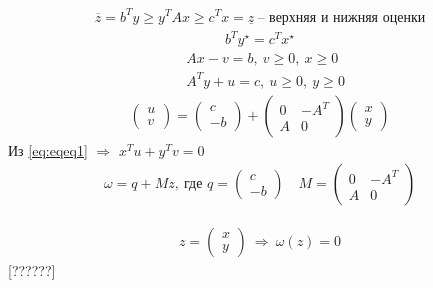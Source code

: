 \documentclass[12pt,a4paper,titlepage,oneside]{book}
\theoremstyle{definition}
\theoremstyle{plain}
\theoremstyle{remark}
\theoremstyle{remark}
\theoremstyle{plain}
\theoremstyle{plain}
\begin{document}
\begin{align*}
\overline{z} = b^T y \geq y^TAx\geq c^Tx = \underline{z} \: \text{-- верхняя и нижняя оценки}
\end{align*}
\begin{align}\label{eq:eqeq1}
b^Ty^\star = c^Tx^\star
\end{align}
\begin{align*}
&Ax - v = b, \: v \geq 0, \: x\geq 0\\
&A^Ty + u = c, \: u \geq 0, \: y \geq 0
\end{align*}
\begin{align*}
\begin{pmatrix}
u\\
v
\end{pmatrix}
=
\begin{pmatrix}
c\\
-b
\end{pmatrix}
+
\begin{pmatrix}
0 & -A^T\\
A & 0
\end{pmatrix}
\begin{pmatrix}
x\\
y
\end{pmatrix}
\end{align*}
Из \eqref{eq:eqeq1} $\Rightarrow$ $x^Tu + y^Tv = 0$
\begin{align*}
\omega = q+ Mz, \: \text{где } q = \begin{pmatrix}
c\\
-b
\end{pmatrix}
\quad
M = \begin{pmatrix}
0 & -A^T\\
A & 0
\end{pmatrix}
\end{align*}

\begin{align*}
z = \begin{pmatrix}
x\\
y
\end{pmatrix}\:
\Rightarrow \: \omega(z) = 0
\end{align*}
[??????]
\end{document}
